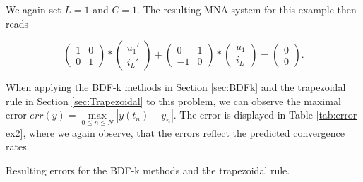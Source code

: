 \begin{example2}
	We again set $L=1$ and $C=1$. The resulting MNA-system for this example then reads
	
	\begin{displaymath}
		\begin{pmatrix}
			1 & 0 \\
			0 & 1 
		\end{pmatrix}
		*
		\begin{pmatrix}
			u_1' \\
			i_L'
		\end{pmatrix}
		+
		\begin{pmatrix}
			0 & 1 \\
			-1 & 0
		\end{pmatrix}
		*
		\begin{pmatrix}
			u_1 \\
			i_L
		\end{pmatrix}
		=
		\begin{pmatrix}
			0 \\
			0 
		\end{pmatrix}.
	\end{displaymath}
	
	When applying the BDF-k methods in Section \ref{sec:BDFk} and the trapezoidal rule in Section \ref{sec:Trapezoidal} to this problem, we can observe the maximal error $err(y) = \max\limits_{0 \leq n \leq N} | y(t_n) - y_n |$. The error is displayed in Table \ref{tab:error ex2}, where we again observe, that the errors reflect the predicted convergence rates.
		
	\begin{table}[H]
		\caption{Resulting errors for the BDF-k methods and the trapezoidal rule.}
		\label{tab:error ex2}
	\end{table}

\end{example2}
	


